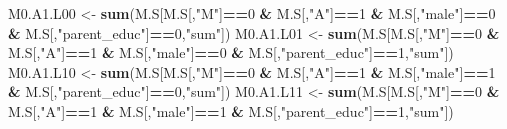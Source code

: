 \documentclass[
]{book}
\newenvironment{Shaded}{\begin{snugshade}}{\end{snugshade}}
\newcommand{\DecValTok}[1]{\textcolor[rgb]{0.00,0.00,0.81}{#1}}
\newcommand{\FunctionTok}[1]{\textcolor[rgb]{0.13,0.29,0.53}{\textbf{#1}}}
\newcommand{\NormalTok}[1]{#1}
\newcommand{\OtherTok}[1]{\textcolor[rgb]{0.56,0.35,0.01}{#1}}
\newcommand{\SpecialCharTok}[1]{\textcolor[rgb]{0.81,0.36,0.00}{\textbf{#1}}}
\newcommand{\StringTok}[1]{\textcolor[rgb]{0.31,0.60,0.02}{#1}}
\begin{document}
\begin{Shaded}
\begin{Highlighting}[]
\NormalTok{  M0.A1.L00 }\OtherTok{\textless{}{-}} \FunctionTok{sum}\NormalTok{(M.S[M.S[,}\StringTok{"M"}\NormalTok{]}\SpecialCharTok{==}\DecValTok{0} \SpecialCharTok{\&}\NormalTok{ M.S[,}\StringTok{"A"}\NormalTok{]}\SpecialCharTok{==}\DecValTok{1} \SpecialCharTok{\&}\NormalTok{ M.S[,}\StringTok{"male"}\NormalTok{]}\SpecialCharTok{==}\DecValTok{0} \SpecialCharTok{\&} 
\NormalTok{                         M.S[,}\StringTok{"parent\_educ"}\NormalTok{]}\SpecialCharTok{==}\DecValTok{0}\NormalTok{,}\StringTok{"sum"}\NormalTok{])}
\NormalTok{  M0.A1.L01 }\OtherTok{\textless{}{-}} \FunctionTok{sum}\NormalTok{(M.S[M.S[,}\StringTok{"M"}\NormalTok{]}\SpecialCharTok{==}\DecValTok{0} \SpecialCharTok{\&}\NormalTok{ M.S[,}\StringTok{"A"}\NormalTok{]}\SpecialCharTok{==}\DecValTok{1} \SpecialCharTok{\&}\NormalTok{ M.S[,}\StringTok{"male"}\NormalTok{]}\SpecialCharTok{==}\DecValTok{0} \SpecialCharTok{\&} 
\NormalTok{                         M.S[,}\StringTok{"parent\_educ"}\NormalTok{]}\SpecialCharTok{==}\DecValTok{1}\NormalTok{,}\StringTok{"sum"}\NormalTok{])}
\NormalTok{  M0.A1.L10 }\OtherTok{\textless{}{-}} \FunctionTok{sum}\NormalTok{(M.S[M.S[,}\StringTok{"M"}\NormalTok{]}\SpecialCharTok{==}\DecValTok{0} \SpecialCharTok{\&}\NormalTok{ M.S[,}\StringTok{"A"}\NormalTok{]}\SpecialCharTok{==}\DecValTok{1} \SpecialCharTok{\&}\NormalTok{ M.S[,}\StringTok{"male"}\NormalTok{]}\SpecialCharTok{==}\DecValTok{1} \SpecialCharTok{\&} 
\NormalTok{                         M.S[,}\StringTok{"parent\_educ"}\NormalTok{]}\SpecialCharTok{==}\DecValTok{0}\NormalTok{,}\StringTok{"sum"}\NormalTok{])}
\NormalTok{  M0.A1.L11 }\OtherTok{\textless{}{-}} \FunctionTok{sum}\NormalTok{(M.S[M.S[,}\StringTok{"M"}\NormalTok{]}\SpecialCharTok{==}\DecValTok{0} \SpecialCharTok{\&}\NormalTok{ M.S[,}\StringTok{"A"}\NormalTok{]}\SpecialCharTok{==}\DecValTok{1} \SpecialCharTok{\&}\NormalTok{ M.S[,}\StringTok{"male"}\NormalTok{]}\SpecialCharTok{==}\DecValTok{1} \SpecialCharTok{\&} 
\NormalTok{                         M.S[,}\StringTok{"parent\_educ"}\NormalTok{]}\SpecialCharTok{==}\DecValTok{1}\NormalTok{,}\StringTok{"sum"}\NormalTok{])}
  

\end{Highlighting}
\end{Shaded}
\end{document}
